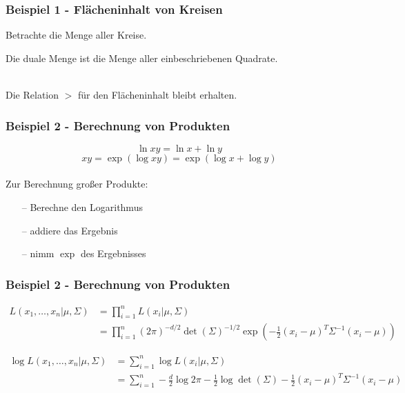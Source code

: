 \documentclass{beamer}
\begin{document}
\begin{frame}
\frametitle{Beispiel 1 - Flächeninhalt von Kreisen}
Betrachte die Menge aller Kreise.

Die duale Menge ist die Menge aller einbeschriebenen Quadrate.\\
\hfill \newline
{}\\
\hfill \newline
Die Relation $>$ für den Flächeninhalt bleibt erhalten.
\end{frame}

\begin{frame}
\frametitle{Beispiel 2 - Berechnung von Produkten}

$$\ln xy = \ln x + \ln y $$
$$xy = \exp(\log xy) = \exp(\log x + \log y)$$\\
\hfill \newline
Zur Berechnung großer Produkte:
\begin{itemize}
    \item[--] Berechne den Logarithmus
    \item[--] addiere das Ergebnis
    \item[--] nimm $\exp$ des Ergebnisses
\end{itemize}
\end{frame}

\begin{frame}
\frametitle{Beispiel 2 - Berechnung von Produkten}
{\footnotesize
\begin{align*}
L(x_1, \dots, x_n|\mu, \Sigma) &= \prod_{i = 1}^{n} L(x_i|\mu, \Sigma)\\
&= \prod_{i = 1}^{n} (2 \pi)^{-d/2} \det(\Sigma)^{-1/2} \exp(- \frac{1}{2} (x_i - \mu)^T \Sigma^{-1} (x_i - \mu))
\end{align*}

\begin{align*}
\log L(x_1, \dots, x_n|\mu, \Sigma) &= \sum_{i = 1}^{n} \log L(x_i|\mu, \Sigma)\\
&= \sum_{i = 1}^{n} -\frac{d}{2} \log 2\pi -\frac{1}{2} \log \det(\Sigma) - \frac{1}{2} (x_i - \mu)^T \Sigma^{-1} (x_i - \mu)
\end{align*}

}%


\end{frame}
\end{document}
